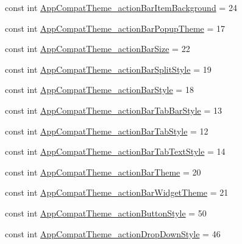 \begin{DoxyCompactItemize}
\item 
const int \mbox{\hyperlink{class_f_w_p_s___app_1_1_droid_1_1_resource_1_1_styleable_a5f85a3261ef2d2faa793a15c1dfb2a8e}{App\+Compat\+Theme\+\_\+action\+Bar\+Item\+Background}} = 24
\item 
const int \mbox{\hyperlink{class_f_w_p_s___app_1_1_droid_1_1_resource_1_1_styleable_a8163d35bdfd7b8b97a785136977dcf9f}{App\+Compat\+Theme\+\_\+action\+Bar\+Popup\+Theme}} = 17
\item 
const int \mbox{\hyperlink{class_f_w_p_s___app_1_1_droid_1_1_resource_1_1_styleable_a31a45d3a6f869445798c12a7419b6a22}{App\+Compat\+Theme\+\_\+action\+Bar\+Size}} = 22
\item 
const int \mbox{\hyperlink{class_f_w_p_s___app_1_1_droid_1_1_resource_1_1_styleable_ab78697488734e3b2d3aee6c1ed444352}{App\+Compat\+Theme\+\_\+action\+Bar\+Split\+Style}} = 19
\item 
const int \mbox{\hyperlink{class_f_w_p_s___app_1_1_droid_1_1_resource_1_1_styleable_a8defa585effa6ee8e7f782a70fa7685f}{App\+Compat\+Theme\+\_\+action\+Bar\+Style}} = 18
\item 
const int \mbox{\hyperlink{class_f_w_p_s___app_1_1_droid_1_1_resource_1_1_styleable_a679319752939653d76da17a22b9bc4f2}{App\+Compat\+Theme\+\_\+action\+Bar\+Tab\+Bar\+Style}} = 13
\item 
const int \mbox{\hyperlink{class_f_w_p_s___app_1_1_droid_1_1_resource_1_1_styleable_a958bbf75dfa8bc49e64f33cc10c64da2}{App\+Compat\+Theme\+\_\+action\+Bar\+Tab\+Style}} = 12
\item 
const int \mbox{\hyperlink{class_f_w_p_s___app_1_1_droid_1_1_resource_1_1_styleable_ab08c36f70d40babd7f2416695b524ccb}{App\+Compat\+Theme\+\_\+action\+Bar\+Tab\+Text\+Style}} = 14
\item 
const int \mbox{\hyperlink{class_f_w_p_s___app_1_1_droid_1_1_resource_1_1_styleable_aec5f55087c1e5b0b5f99bd76bbd5de36}{App\+Compat\+Theme\+\_\+action\+Bar\+Theme}} = 20
\item 
const int \mbox{\hyperlink{class_f_w_p_s___app_1_1_droid_1_1_resource_1_1_styleable_a2da833cf6ee54d68189e6b5f694fba90}{App\+Compat\+Theme\+\_\+action\+Bar\+Widget\+Theme}} = 21
\item 
const int \mbox{\hyperlink{class_f_w_p_s___app_1_1_droid_1_1_resource_1_1_styleable_a92c4d8a58180b1fe26ae8f60277cb545}{App\+Compat\+Theme\+\_\+action\+Button\+Style}} = 50
\item 
const int \mbox{\hyperlink{class_f_w_p_s___app_1_1_droid_1_1_resource_1_1_styleable_ac84cbd63742120bc958deff172b39abe}{App\+Compat\+Theme\+\_\+action\+Drop\+Down\+Style}} = 46

\end{DoxyCompactItemize}
